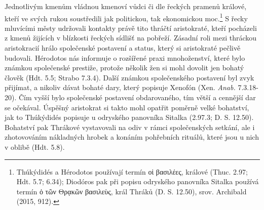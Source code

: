Jednotlivým kmenům vládnou kmenoví vůdci či dle řeckých pramenů králové, kteří ve svých rukou soustředili jak politickou, tak ekonomickou moc.\footnote{Thúkýdidés a Hérodotos používají termín οἱ βασιλέες, králové (Thuc. 2.97; Hdt. 5.7; 6.34); Diodóros pak při popisu odryského panovníka Sitalka používá termín ὁ τῶν Θρᾳκῶν βασιλεὺς, král Thráků (D. S. 12.50), srov. Archibald (2015, 912).} S řecky mluvícími městy udržovali kontakty právě tito thráčtí aristokraté, kteří pocházeli z kmenů žijících v blízkosti řeckých sídlišť na pobřeží. Zásadní roli mezi thráckou aristokracií hrálo společenské postavení a status, který si aristokraté pečlivě budovali. Hérodotos nás informuje o rozšířené praxi mnohoženství, které bylo známkou společenské prestiže, protože několik žen si mohl dovolit jen bohatý člověk (Hdt. 5.5; Strabo 7.3.4). Další známkou společenského postavení byl zvyk přijímat, a nikoliv dávat bohaté dary, který popisuje Xenofón (Xen. {\em Anab.} 7.3.18-20). Čím vyšší bylo společenské postavení obdarovaného, tím větší a cennější dar se očekával. Úspěšný aristokrat si takto mohl opatřit poměrně velké bohatství, jak to Thúkýdidés popisuje u odryského panovníka Sitalka (2.97.3; D. S. 12.50). Bohatství pak Thrákové vystavovali na odiv v rámci společenských setkání, ale i zhotovováním nákladných hrobek a konáním pohřebních rituálů, které jsou u nich v oblibě (Hdt. 5.8).

